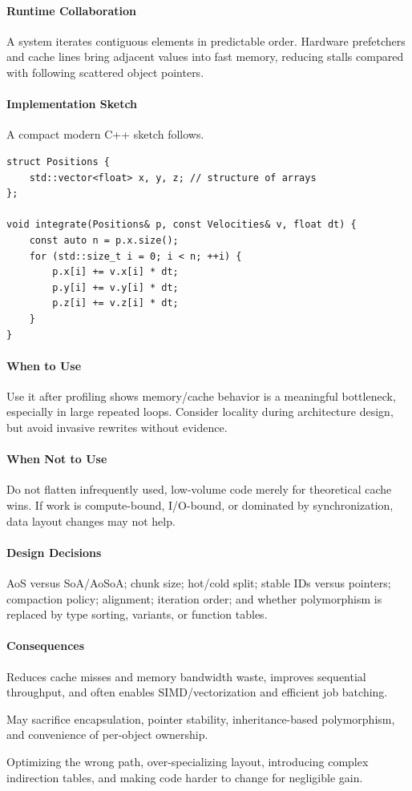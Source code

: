 \documentclass[11pt]{article}
\begin{document}
\paragraph{Runtime Collaboration} A system iterates contiguous elements in predictable order. Hardware prefetchers and cache lines bring adjacent values into fast memory, reducing stalls compared with following scattered object pointers.
\paragraph{Implementation Sketch} A compact modern C++ sketch follows.
\begin{lstlisting}
struct Positions {
    std::vector<float> x, y, z; // structure of arrays
};

void integrate(Positions& p, const Velocities& v, float dt) {
    const auto n = p.x.size();
    for (std::size_t i = 0; i < n; ++i) {
        p.x[i] += v.x[i] * dt;
        p.y[i] += v.y[i] * dt;
        p.z[i] += v.z[i] * dt;
    }
}
\end{lstlisting}
\paragraph{When to Use} Use it after profiling shows memory/cache behavior is a meaningful bottleneck, especially in large repeated loops. Consider locality during architecture design, but avoid invasive rewrites without evidence.
\paragraph{When Not to Use} Do not flatten infrequently used, low-volume code merely for theoretical cache wins. If work is compute-bound, I/O-bound, or dominated by synchronization, data layout changes may not help.
\paragraph{Design Decisions} AoS versus SoA/AoSoA; chunk size; hot/cold split; stable IDs versus pointers; compaction policy; alignment; iteration order; and whether polymorphism is replaced by type sorting, variants, or function tables.
\paragraph{Consequences}
\begin{description}[leftmargin=2.7cm,style=nextline]
\item[Benefits] Reduces cache misses and memory bandwidth waste, improves sequential throughput, and often enables SIMD/vectorization and efficient job batching.
\item[Costs] May sacrifice encapsulation, pointer stability, inheritance-based polymorphism, and convenience of per-object ownership.
\item[Risks] Optimizing the wrong path, over-specializing layout, introducing complex indirection tables, and making code harder to change for negligible gain.
\end{description}
\end{document}
